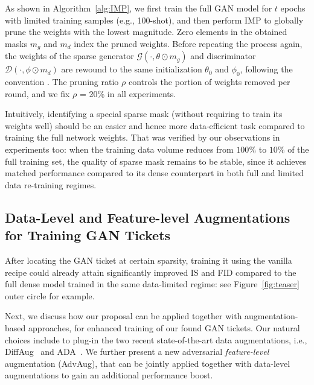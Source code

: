 \documentclass{article}
\begin{document}
As shown in Algorithm~\ref{alg:IMP}, we first train the full GAN model for $t$ epochs with limited training samples (e.g., 100-shot), and then perform IMP to globally prune the weights with the lowest magnitude. Zero elements in the obtained masks $m_g$ and $m_d$ index the pruned weights. Before repeating the process again, the weights of the sparse generator $\mathcal{G}(\cdot,\theta\odot m_g)$ and discriminator $\mathcal{D}(\cdot,\phi\odot m_d)$ are rewound to the same initialization $\theta_0$ and $\phi_0$, following the convention \cite{Frankle:2019vz}. The pruning ratio $\rho$ controls the portion of weights removed per round, and we fix $\rho$ = 20\% in all experiments. 

Intuitively, identifying a special sparse mask (without requiring to train its weights well) should be an easier and hence more data-efficient task compared to training the full network weights. That was verified by our observations in experiments too: when the training data volume reduces from $100\%$ to $10\%$ of the full training set, the quality of sparse mask remains to be stable, since it achieves matched performance compared to its dense counterpart in both full and limited data re-training regimes.

\vspace{-0.5em}
\subsection{Data-Level and Feature-level Augmentations for Training GAN Tickets}
\vspace{-0.5em}
After locating the GAN ticket at certain sparsity, training it using the vanilla recipe could already attain significantly improved IS and FID compared to the full dense model trained in the same data-limited regime: see Figure~\ref{fig:teaser} outer circle for example. 

Next, we discuss how our proposal can be applied together with augmentation-based approaches, for enhanced training of our found GAN tickets. Our natural choices include to plug-in the two recent state-of-the-art data augmentations, i.e., DiffAug~\citep{zhao2020diffaugment} and ADA~\citep{karras2020training}. We further present a new adversarial \textit{feature-level} augmentation (AdvAug), that can be jointly applied together with data-level augmentations to gain an additional performance boost. 
\end{document}
